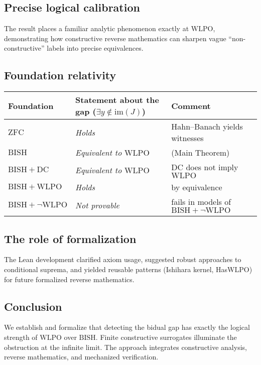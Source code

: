 \documentclass[11pt]{article}
\newcommand{\WLPO}{\mathrm{WLPO}}
\newcommand{\BISH}{\mathrm{BISH}}
\newcommand{\DC}{\mathrm{DC}}
\newcommand{\ZFC}{\mathrm{ZFC}}
\begin{document}
\subsection{Precise logical calibration}

The result places a familiar analytic phenomenon exactly at $\WLPO$, demonstrating how constructive reverse mathematics can sharpen vague ``non-constructive'' labels into precise equivalences.

\subsection{Foundation relativity}

\begin{center}
\small %
\begin{tabular}{lll}
\toprule
Foundation & Statement about the gap ($\exists y\notin \mathrm{im}(J)$) & Comment \\
\midrule
$\ZFC$ & \emph{Holds} & Hahn--Banach yields witnesses \\
$\BISH$ & \emph{Equivalent to $\WLPO$} & (Main Theorem) \\
$\BISH+\DC$ & \emph{Equivalent to $\WLPO$} & $\DC$ does not imply $\WLPO$ \\
$\BISH+\WLPO$ & \emph{Holds} & by equivalence \\
$\BISH+\neg\WLPO$ & \emph{Not provable} & fails in models of $\BISH+\neg\WLPO$ \\
\bottomrule
\end{tabular}
\end{center}

\subsection{The role of formalization}

The Lean development clarified axiom usage, suggested robust approaches to conditional suprema, and yielded reusable patterns (Ishihara kernel, HasWLPO) for future formalized reverse mathematics.

\subsection{Conclusion}

We establish and formalize that detecting the bidual gap has exactly the logical strength of $\WLPO$ over $\BISH$. Finite constructive surrogates illuminate the obstruction at the infinite limit. The approach integrates constructive analysis, reverse mathematics, and mechanized verification.
\end{document}
